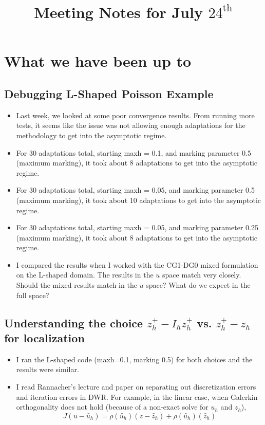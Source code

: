 \documentclass[12pt,a4paper]{article}
\title{Meeting Notes for July $24^{\text{th}}$}
\author{}
\date{}
\begin{document}
\maketitle

\section{What we have been up to}

\subsection{Debugging L-Shaped Poisson Example}

\begin{itemize}
    \item Last week, we looked at some poor convergence results. From running more tests, it seems like the issue was not allowing enough adaptations for the methodology to get into the asymptotic regime.
    \item For 30 adaptations total, starting maxh = 0.1, and marking parameter 0.5 (maximum marking), it took about 8 adaptations to get into the asymptotic regime.
    \item For 30 adaptations total, starting maxh = 0.05, and marking parameter 0.5 (maximum marking), it took about 10 adaptations to get into the asymptotic regime.
    \item For 30 adaptations total, starting maxh = 0.05, and marking parameter 0.25 (maximum marking), it took about 8 adaptations to get into the asymptotic regime.
    \item I compared the results when I worked with the CG1-DG0 mixed formulation on the L-shaped domain. The results in the $u$ space match very closely. Should the mixed results match in the $u$ space? What do we expect in the full space?
\end{itemize}

\subsection{Understanding the choice $z_h^+ - I_h z_h^+$ vs. $z_h^+ - z_h$ for localization}

\begin{itemize}
    \item I ran the L-shaped code (maxh=0.1, marking 0.5) for both choices and the results were similar. 
    \item I read Rannacher's lecture and paper on separating out discretization errors and iteration errors in DWR. For example, in the linear case, when Galerkin orthogonality does not hold (because of a non-exact solve for $u_h$ and $z_h$), 
    $$ J(u - \tilde{u_h}) = \rho(\tilde{u_h})(z-\tilde{z_h}) + \rho(\tilde{u_h})(\tilde{z_h})$$
\end{itemize}
\end{document}
